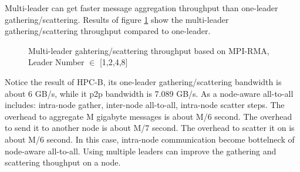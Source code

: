 Multi-leader can get faster message aggregation throughput than one-leader gathering/scattering.
Results of figure \ref{multileader-gather} show the multi-leader gathering/scattering throughput compared to one-leader.
\begin{figure}[!htb]
  \centering
  \caption{Multi-leader gahtering/scattering throughput based on MPI-RMA, Leader Number $\in$ [1,2,4,8]}
	\label{multileader-gather}
	\vspace{0.2in}
\end{figure}
Notice the result of HPC-B, its one-leader gathering/scattering bandwidth is about 6 GB/s, while it p2p bandwidth is 7.089 GB/s.
As a node-aware all-to-all includes: intra-node gather, inter-node all-to-all, intra-node scatter steps.
The overhead to aggregate M gigabyte messages is about M/6 second.
The overhead to send it to another node is about M/7 second.
The overhead to scatter it on is about M/6 second.
In this case, intra-node communication become  bottelneck of node-aware all-to-all.
Using multiple leaders can improve the gathering and scattering thoughput on a node.

